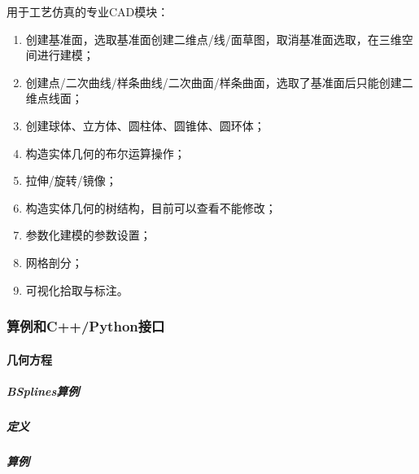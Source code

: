 \documentclass[letterpaper,10pt,english]{sphinxmanual}
\begin{document}
\sphinxAtStartPar
用于工艺仿真的专业CAD模块：
\begin{enumerate}
%
\item {} 
\sphinxAtStartPar
创建基准面，选取基准面创建二维点/线/面草图，取消基准面选取，在三维空间进行建模；

\item {} 
\sphinxAtStartPar
创建点/二次曲线/样条曲线/二次曲面/样条曲面，选取了基准面后只能创建二维点线面；

\item {} 
\sphinxAtStartPar
创建球体、立方体、圆柱体、圆锥体、圆环体；

\item {} 
\sphinxAtStartPar
构造实体几何的布尔运算操作；

\item {} 
\sphinxAtStartPar
拉伸/旋转/镜像；

\item {} 
\sphinxAtStartPar
构造实体几何的树结构，目前可以查看不能修改；

\item {} 
\sphinxAtStartPar
参数化建模的参数设置；

\item {} 
\sphinxAtStartPar
网格剖分；

\item {} 
\sphinxAtStartPar
可视化拾取与标注。

\end{enumerate}

\sphinxstepscope


\subsubsection{算例和C++/Python接口}
\label{\detokenize{src/fengsim/cad_example:c-python}}\label{\detokenize{src/fengsim/cad_example::doc}}

\paragraph{几何方程}
\label{\detokenize{src/fengsim/cad_example:id1}}

\subparagraph{B\sphinxhyphen{}Splines算例}
\label{\detokenize{src/fengsim/cad_example:b-splines}}

\subparagraph{定义}
\label{\detokenize{src/fengsim/cad_example:id2}}

\subparagraph{算例}
\label{\detokenize{src/fengsim/cad_example:id3}}
\sphinxstepscope
\end{document}
